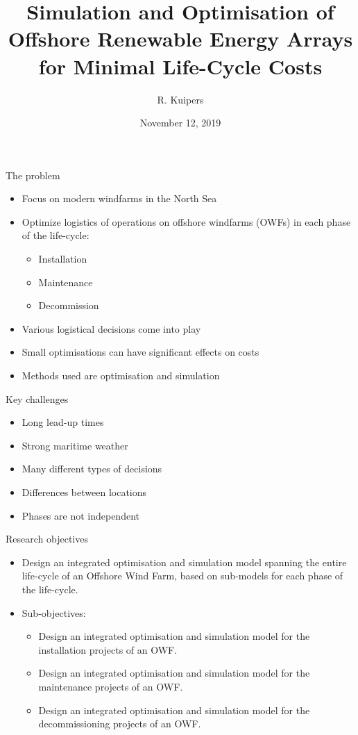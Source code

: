 \documentclass{beamer}
\title[Logistical Optimisation for Offshore Windfarms]{Simulation and Optimisation of Offshore Renewable Energy Arrays for Minimal Life-Cycle Costs}
\author{R. Kuipers}
\date{November 12, 2019}
\begin{document}
\begin{frame}
  \titlepage
\end{frame}

\begin{frame}{The problem}
  \begin{itemize}
  	\item Focus on modern windfarms in the North Sea
  	\item Optimize logistics of operations on offshore windfarms (OWFs) in each phase of the life-cycle:
  	\begin{itemize}
  		\item Installation
  		\item Maintenance
  		\item Decommission
  	\end{itemize}
  	\item Various logistical decisions come into play
  	\item Small optimisations can have significant effects on costs
  	\item Methods used are optimisation and simulation
  \end{itemize}
\end{frame}


\begin{frame}{Key challenges}
  \begin{itemize}
  	\item Long lead-up times
  	\item Strong maritime weather
  	\item Many different types of decisions
  	\item Differences between locations
  	\item Phases are not independent
  \end{itemize}
\end{frame}


\begin{frame}{Research objectives}
  \begin{itemize}
  	\item Design an integrated optimisation and simulation model spanning the entire life-cycle of an Offshore Wind Farm, based on sub-models for each phase of the life-cycle.
  	\item Sub-objectives:
  	\begin{itemize}
  		\item Design an integrated optimisation and simulation model for the installation projects of an OWF. 
  		\item Design an integrated optimisation and simulation model for the maintenance projects of an OWF. 
  		\item Design an integrated optimisation and simulation model for the decommissioning projects of an OWF. 
  	\end{itemize}
  \end{itemize}
\end{frame}
\end{document}
